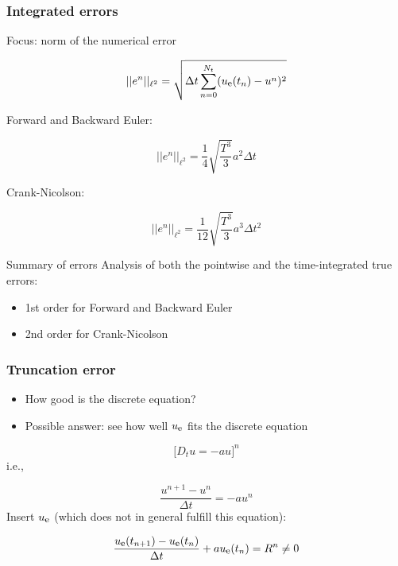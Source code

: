 \documentclass{beamer}
\begin{document}
\begin{frame}
\frametitle{Integrated errors}

Focus: norm of the numerical error

\[ ||e^n||_{\ell^2} = \sqrt{\Delta t\sum_{n=0}^{N_t} ({\uex}(t_n) - u^n)^2}\]

Forward and Backward Euler:

\[ ||e^n||_{\ell^2} = \frac{1}{4}\sqrt{\frac{T^3}{3}} a^2\Delta t\]

Crank-Nicolson:

\[ ||e^n||_{\ell^2} = \frac{1}{12}\sqrt{\frac{T^3}{3}}a^3\Delta t^2\]


\begin{block}{Summary of errors }
Analysis of both the pointwise and the time-integrated true errors:

\begin{itemize}
  \item 1st order for Forward and Backward Euler

  \item 2nd order for Crank-Nicolson
\end{itemize}

\noindent
\end{block}
\end{frame}

\begin{frame}
\frametitle{Truncation error}

\begin{itemize}
 \item How good is the discrete equation?

 \item Possible answer: see how well $\uex$ fits the discrete equation
\end{itemize}

\noindent
\[ \lbrack D_t u = -au\rbrack^n\]
i.e.,

\[ \frac{u^{n+1}-u^n}{\Delta t} = -au^n\]
Insert $\uex$ (which does not in general fulfill this equation):

\begin{equation}
\frac{\uex(t_{n+1})-\uex(t_n)}{\Delta t} + a\uex(t_n) = R^n \neq 0
\label{decay:analysis:trunc:Req}
\end{equation}
\end{frame}
\end{document}
